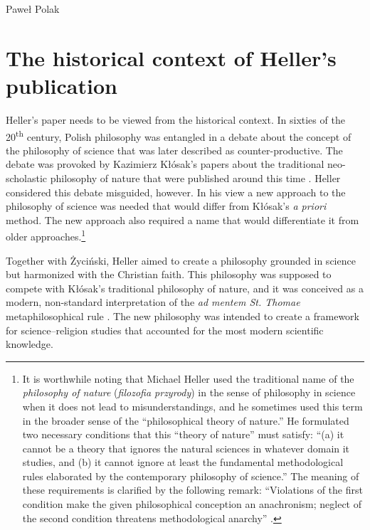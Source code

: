 \begin{artengenv}{Paweł Polak}
\section{The historical context of Heller’s publication}
Heller’s paper needs to be viewed from the historical context. In sixties of the 20\textsuperscript{th} century, Polish
philosophy was entangled in a debate about the concept of the philosophy of science that was later described as
counter-productive. The debate was provoked by Kazimierz Kłósak’s papers about the traditional neo-scholastic
philosophy of nature that were published around this time
\parencite[p.150]{pol_heller_how_1995}.
Heller considered this debate
misguided, however. In his view a new approach to the philosophy of science was needed that would differ from Kłósak’s
\textit{a priori} method. The new approach also required a name that would differentiate it from older
approaches.\footnote{It is worthwhile noting that Michael Heller used the traditional name of the \textit{philosophy of
nature} (\textit{filozofia przyrody}) in the sense of philosophy in science when it does not lead to misunderstandings,
and he sometimes used this term in the broader sense of the ``philosophical theory of nature.'' He formulated two
necessary conditions that this ``theory of nature'' must satisfy: ``(a) it cannot be a theory that ignores the natural
sciences in whatever domain it studies, and (b) it cannot ignore at least the fundamental methodological rules
elaborated by the contemporary philosophy of science.'' The meaning of these requirements is clarified by the following
remark: ``Violations of the first condition make the given philosophical conception an anachronism; neglect of the
second condition threatens methodological anarchy''
\parencite[p.15]{pol_heller_philosophy_2011}.
}

Together with Życiński, Heller aimed to create a philosophy grounded in science but harmonized with the Christian faith.
This philosophy was supposed to compete with Kłósak’s traditional philosophy of nature, and it was conceived as a
modern, non-standard interpretation of the \textit{ad mentem St. Thomae} metaphilosophical rule
\parencite{pol_leo_xiii_aeterni_1879}.
The new philosophy was intended to create a framework for science–religion studies that
accounted for the most modern scientific knowledge. 


\end{artengenv}
